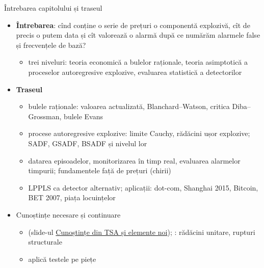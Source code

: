 \begin{frame}{Întrebarea capitolului și traseul}
\itemsize{\small}
\begin{itemize}
    \item \textbf{Întrebarea}: cînd conține o serie de prețuri o componentă explozivă, cît de precis o putem data și cît valorează o alarmă după ce numărăm alarmele false și frecvențele de bază?
    \begin{itemize}
        \item trei niveluri: teoria economică a bulelor raționale, teoria asimptotică a proceselor autoregresive explozive, evaluarea statistică a detectorilor
    \end{itemize}
    \item \textbf{Traseul}
    \begin{itemize}
        \item bulele raționale: valoarea actualizată, Blanchard--Watson, critica Diba--Grossman, bulele Evans
        \item procese autoregresive explozive: limite Cauchy, rădăcini ușor explozive; SADF, GSADF, BSADF și nivelul lor
        \item datarea episoadelor, monitorizarea în timp real, evaluarea alarmelor timpurii; fundamentele față de prețuri (chirii)
        \item LPPLS ca detector alternativ; aplicații: dot-com, Shanghai 2015, Bitcoin, BET 2007, piața locuințelor
    \end{itemize}
    \item Cunoștințe necesare și continuare
    \begin{itemize}
        \item {} (slide-ul \hyperlink{c16known}{\textcolor{MainBlue}{Cunoștințe din TSA și elemente noi}}); : rădăcini unitare, rupturi structurale
        \item {} aplică testele pe piețe
    \end{itemize}
\end{itemize}
\end{frame}

